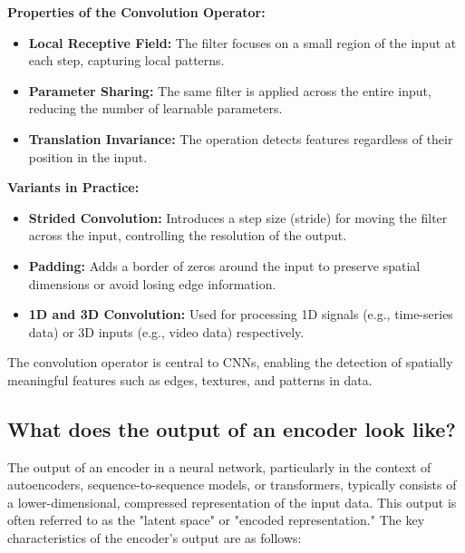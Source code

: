 \textbf{Properties of the Convolution Operator:}
\begin{itemize}
    \item \textbf{Local Receptive Field:} The filter focuses on a small region of the input at each step, capturing local patterns.
    \item \textbf{Parameter Sharing:} The same filter is applied across the entire input, reducing the number of learnable parameters.
    \item \textbf{Translation Invariance:} The operation detects features regardless of their position in the input.
\end{itemize}

\textbf{Variants in Practice:}
\begin{itemize}
    \item \textbf{Strided Convolution:} Introduces a step size (stride) for moving the filter across the input, controlling the resolution of the output.
    \item \textbf{Padding:} Adds a border of zeros around the input to preserve spatial dimensions or avoid losing edge information.
    \item \textbf{1D and 3D Convolution:} Used for processing 1D signals (e.g., time-series data) or 3D inputs (e.g., video data) respectively.
\end{itemize}

The convolution operator is central to CNNs, enabling the detection of spatially meaningful features such as edges, textures, and patterns in data.


\subsection{What does the output of an encoder look like?}

The output of an encoder in a neural network, particularly in the context of autoencoders, sequence-to-sequence models, or transformers, typically consists of a lower-dimensional, compressed representation of the input data. This output is often referred to as the "latent space" or "encoded representation." The key characteristics of the encoder's output are as follows:

